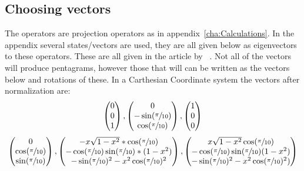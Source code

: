 \documentclass[
  utf8,%
  parskip,%
  largesmallcaps,intlimits,widermath,%
  sharecounter,nobreak,definition=marks,%
  noparts%
]{rtthesis}
\begin{document}
\subsection{Choosing vectors}\label{subsec:Choosing vectors}
The operators are projection operators as in  appendix~\ref{cha:Calculations}. 
In the appendix several states/vectors are used, they are all given below as eigenvectors to these operators. These are all given in the article by ~\cite{Kochen1968The}. Not all of the vectors will produce pentagrams, however those that will can be written as the vectors below and rotations of these.
In a Carthesian Coordinate system the vectors after normalization are:
\\
\begin{equation*}
\begin{pmatrix}
0\\
0\\
1\\
\end{pmatrix}
,
\begin{pmatrix}
0\\
-\sin(\sfrac{\pi}{10})\\
\cos(\sfrac{\pi}{10})
\end{pmatrix}
,
\begin{pmatrix}
1\\
0\\
0\\
\end{pmatrix}
\end{equation*}
\begin{equation*}
\begin{pmatrix}
0\\
\cos(\sfrac{\pi}{10})\\
\sin(\sfrac{\pi}{10})\\
\end{pmatrix}
,
\begin{pmatrix}
-x\sqrt{1-x^2}*\cos(\sfrac{\pi}{10})\\
-\cos(\sfrac{\pi}{10})\sin(\sfrac{\pi}{10})*(1-x^2)\\
-\sin(\sfrac{\pi}{10})^2-x^2\cos(\sfrac{\pi}{10})^2\\
\end{pmatrix}
,
\begin{pmatrix}
x\sqrt{1-x^2}\cos(\sfrac{\pi}{10})\\
-\cos(\sfrac{\pi}{10})\sin(\sfrac{\pi}{10})(1-x^2)\\
-\sin(\sfrac{\pi}{10})^2-x^2\cos(\sfrac{\pi}{10})^2)\\
\end{pmatrix}
\end{equation*}
\end{document}
